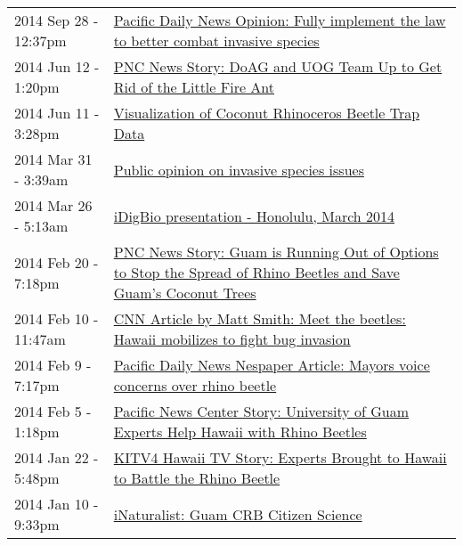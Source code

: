 \begin{longtable}{p{} p{}}
2014 Sep 28 - 12:37pm & \href{http://guaminsects.net/anr/content/pacific-daily-news-opinion-fully-implement-law-better-combat-invasive-species}{Pacific Daily News Opinion: Fully implement the law to better combat invasive species} \\
2014 Jun 12 - 1:20pm & \href{http://guaminsects.net/anr/content/pnc-news-story-doag-and-uog-team-get-rid-little-fire-ant}{PNC News Story: DoAG and UOG Team Up to Get Rid of the Little Fire Ant} \\
2014 Jun 11 - 3:28pm & \href{http://guaminsects.net/anr/content/visualization-coconut-rhinoceros-beetle-trap-data}{Visualization of Coconut Rhinoceros Beetle Trap Data} \\
2014 Mar 31 - 3:39am & \href{http://guaminsects.net/anr/content/public-opinion-invasive-species-issues}{Public opinion on invasive species issues} \\
2014 Mar 26 - 5:13am & \href{http://guaminsects.net/anr/content/idigbio-presentation-honolulu-march-2014}{iDigBio presentation - Honolulu, March 2014} \\
2014 Feb 20 - 7:18pm & \href{http://guaminsects.net/anr/content/pnc-news-story-guam-running-out-options-stop-spread-rhino-beetles-and-save-guams-coconut-tre}{PNC News Story: Guam is Running Out of Options to Stop the Spread of Rhino Beetles and Save Guam's Coconut Trees} \\
2014 Feb 10 - 11:47am & \href{http://guaminsects.net/anr/content/cnn-article-matt-smith-meet-beetles-hawaii-mobilizes-fight-bug-invasion}{CNN Article by Matt Smith: Meet the beetles: Hawaii mobilizes to fight bug invasion} \\
2014 Feb 9 - 7:17pm & \href{http://guaminsects.net/anr/content/pacific-daily-news-nespaper-article-mayors-voice-concerns-over-rhino-beetle}{Pacific Daily News Nespaper Article: Mayors voice concerns over rhino beetle} \\
2014 Feb 5 - 1:18pm & \href{http://guaminsects.net/anr/content/pacific-news-center-story-university-guam-experts-help-hawaii-rhino-beetles}{Pacific News Center Story: University of Guam Experts Help Hawaii with Rhino Beetles} \\
2014 Jan 22 - 5:48pm & \href{http://guaminsects.net/anr/content/kitv4-hawaii-tv-story-experts-brought-hawaii-battle-rhino-beetle}{KITV4 Hawaii TV Story: Experts Brought to Hawaii to Battle the Rhino Beetle} \\
2014 Jan 10 - 9:33pm & \href{http://guaminsects.net/anr/content/inaturalist-guam-crb-citizen-science}{iNaturalist: Guam CRB Citizen Science} \\

\end{longtable}
